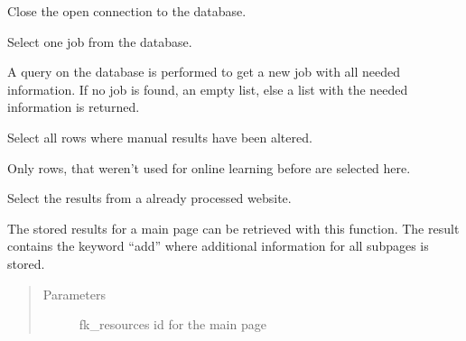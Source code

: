 \documentclass[letterpaper,10pt,english]{sphinxmanual}
\begin{document}
\begin{fulllineitems}
\begin{fulllineitems}
\end{fulllineitems}


\begin{fulllineitems}
\label{\detokenize{api:db_interface.DBInterface.disconnect}}
Close the open connection to the database.

\end{fulllineitems}


\begin{fulllineitems}
\label{\detokenize{api:db_interface.DBInterface.get_job}}
Select one job from the database.

A query on the database is performed to get a new job with all needed
information. If no job is found, an empty list, else a list
with the needed information is returned.

\end{fulllineitems}


\begin{fulllineitems}
\label{\detokenize{api:db_interface.DBInterface.get_manual_data}}
Select all rows where manual results have been altered.

Only rows, that weren’t used for online learning before are
selected here.

\end{fulllineitems}


\begin{fulllineitems}
\label{\detokenize{api:db_interface.DBInterface.get_results_with_parent_resources}}
Select the results from a already processed website.

The stored results for a main page can be retrieved with this
function. The result contains the keyword “add” where
additional information for all subpages is stored.
\begin{quote}\begin{description}
\item[{Parameters}] \leavevmode
{} \textendash{} fk\_resources id for the main page


\end{description}
\end{quote}
\end{fulllineitems}
\end{fulllineitems}
\end{document}
